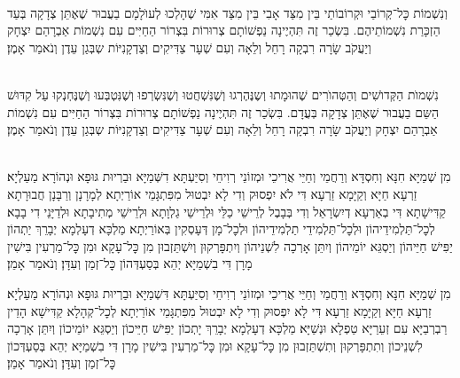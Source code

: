 \documentclass[twoside, openany, parskip=half, 11pt]{book}
\begin{document}
 \\
וְנִשְׁמוֹת כׇּל־קְרוֹבַי וּקְרוֹבוֹתַי בֵּין מִצַּד אָבִי בֵּין מִצַּד אִמִּי
שְׁהָלְכוּ לְעוׂלָמָם
בַעֲבוּר שֶׁאֶתֵּן צְדָקָה בְּעַד הַזְכָּרַת נִשְׁמוֹתֵיהֶם. בִּשְׂכַר זֶה תִּהְיֶינָה נַפְשׁוֹתָם צְרוּרוֹת בִּצְרוֹר הַחַיִּים עִם נִשְׁמוֹת אַבְרָהַם יִצְחָק וְיַעֲקֹב שָׂרָה רִבְקָה רָחֵל וְלֵאָה וְעִם שְׁעָר צַדִּיקִים וְצַדְקָנִיּוֹת שְבְּגַן עֵדֶן וְנֹאמַר אָמֶן׃



\\
נִשְׁמוׂת הַקְּדוׂשִׁים וְהַטְּהוׂרִים
שֶׁהוּמָתוּ וְשֶנֶּהֶרְגוּ וְשֶׁנִּשְׁחֲטוּ וְשֶׁנִּשְׂרְפוּ וְשֶׁנִּטְבְּעוּ וְשֶׁנֶּחְנְקוּ עַל קִדּוּשׁ הַשֵּם בַעֲבוּר שֶׁאֶתֵּן צְדָקָה בְּעֲדָם. בִּשְׂכַר זֶה תִּהְיֶינָה נַפְשׁוֹתָם צְרוּרוֹת בִּצְרוֹר הַחַיִּים עִם נִשְׁמוֹת אַבְרָהַם יִצְחָק וְיַעֲקֹב שָׂרָה רִבְקָה רָחֵל וְלֵאָה וְעִם שְׁעָר צַדִּיקִים וְצַדְקָנִיּוֹת שְבְּגַן עֵדֶן וְנֹאמַר אָמֶן׃


\shabbos\\
מִן שְׁמַיָּא חִנָּא וְחִסְדָּא וְרַחֲמֵי וְחַיֵּי אֲרִיכֵי וּמְזוֹנֵי רְוִיחֵי וְסִיַּעְתָּא דִשְּׁמַיָּא וּבַרְיוּת גּוּפָא וּנְהוֹרָא מַעַלְיָא׃ זַרְעָא חַיָּא וְקַיָּמָא זַרְעָא דִּי לֹא יִפְסוּק וְדִי לָא יִבְטוּל מִפִּתְגָּמֵי אוֹרַיְתָא׃ לְמָרָנָן וְרַבָּנָן חֲבוּרָתָא קַדִּישָׁתָא דִּי בְאַרְעָא דְיִשְׂרָאֵל וְדִי בְּבָבֶל לְרֵישֵׁי כַלֵּי וּלְרֵישֵׁי גַלְוָתָא וּלְרֵישֵׁי מְתִיבָתָא וּלְדַיָּנֵי דִי בָבָא׃ לְכׇל־תַּלְמִידֵיהוֹן וּלְכׇל־תַּלְמִידֵי תַלְמִידֵיהוֹן וּלְכׇל־מָן דְּעָסְקִין בְּאוֹרַיְתָא׃ מַלְכָּא דְעָלְמָא יְבָרֵךְ יַתְהוֹן יַפִּישׁ חַיֵּיהוֹן וְיַסְגֵּא יוֹמֵיהוֹן וְיִתֵּן אָרְכָה לִשְׁנֵיהוֹן וְיִתְפָּרְקוּן וְיִשְׁתֵּזְבוּן מִן כׇּל־עָקָא וּמִן כׇּל־מַרְעִין בִּישִׁין מָרָן דִּי בִשְׁמַיָּא יְהֵא בְּסַעְדְּהוֹן כׇּל־זְמַן וְעִדָּן׃ וְנֹאמַר אָמֵן׃



מִן שְׁמַיָּא חִנָּא וְחִסְדָּא וְרַחֲמֵי וְחַיֵּי אֲרִיכֵי וּמְזוֹנֵי רְוִיחֵי וְסִיַּעְתָּא דִּשְׁמַיָּא וּבַרְיוּת גּוּפָא וּנְהוֹרָא מַעַלְיָא׃ זַרְעָא חַיָּא וְקַיָּמָא זַרְעָא דִּי לָא יִפְסוּק וְדִי לָא יִבְטוּל מִפִּתְגָּמֵי אוֹרַיְתָא׃ לְכׇל־קְהָלָא קַדִּישָׁא הָדֵין רַבְרְבַיָּא עִם זְעֵרַיָּא טַפְלָא וּנְשַׁיָּא׃ מַלְכָּא דְעָלְמָא יְבָרֵךְ יָתְכוֹן יַפִּישׁ חַיֵּיכוֹן וְיַסְגֵּא יוֹמֵיכוֹן וְיִתֵּן אָרְכָה לִשְׁנֵיכוֹן וְתִתְפָּרְקוּן וְתִשְׁתֵּזְבוּן מִן כׇּל־עָקָא וּמִן כׇּל־מַרְעִין בִּישִׁין מָרָן דִּי בִשְׁמַיָּא יְהֵא בְּסַעְדְּכוֹן כׇּל־זְמַן וְעִדָּן׃ וְנֹאמַר אָמֵן׃
\end{document}
